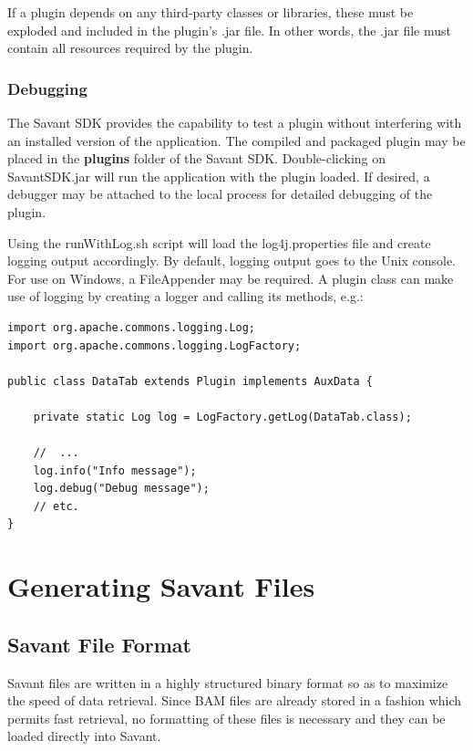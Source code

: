 \documentclass{report}
\begin{document}
If a plugin depends on any third-party classes or libraries, these must be exploded and included in the plugin's .jar file. In other words, the .jar file must contain all resources required by the plugin.

\subsection{Debugging}

The Savant SDK provides the capability to test a plugin without interfering with an installed version of the application. The compiled and packaged plugin may be placed in the {\bf plugins} folder of the Savant SDK. Double-clicking on SavantSDK.jar will run the application with the plugin loaded. If desired, a debugger may be attached to the local process for detailed debugging of the plugin. 

Using the runWithLog.sh script will load the log4j.properties file and create logging output accordingly. By default, logging output goes to the Unix console. For use on Windows, a FileAppender may be required. A plugin class can make use of logging by creating a logger and calling its methods, e.g.:

\begin{verbatim}
import org.apache.commons.logging.Log;
import org.apache.commons.logging.LogFactory;

public class DataTab extends Plugin implements AuxData {

    private static Log log = LogFactory.getLog(DataTab.class);

    //  ...
    log.info("Info message");
    log.debug("Debug message");
    // etc.
}
\end{verbatim}

\chapter{Generating Savant Files}

\section{Savant File Format}

Savant files are written in a highly structured binary format so as to maximize the speed of data retrieval. Since BAM files are already stored in a fashion which permits fast retrieval, no formatting of these files is necessary and they can be loaded directly into Savant.
\end{document}
